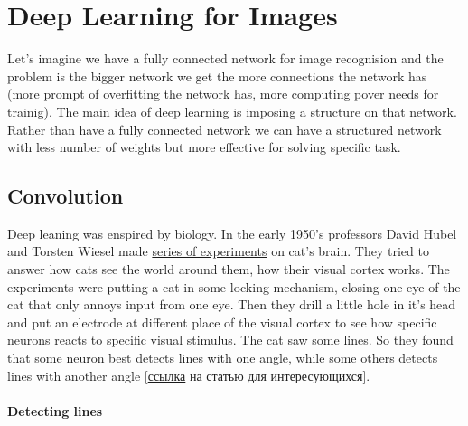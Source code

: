 \chapter{Deep Learning for Images}

{\sf Let's imagine we have a fully connected network for image recognision and the problem is the bigger network we get the more connections the network has (more prompt of overfitting the network has, more computing pover needs for trainig). The main idea of deep learning is imposing a structure on that network. Rather than have a fully connected network we can have a structured network with less number of weights but more effective for solving specific task.}

\section{Convolution}

Deep leaning was enspired by biology. In the early 1950's professors David Hubel and Torsten Wiesel made \href{https://youtu.be/IOHayh06LJ4}{series of experiments} on cat's brain. They tried to answer how cats see the world around them, how their visual cortex works. The experiments were putting a cat in some locking mechanism, closing one eye of the cat that only annoys input from one eye. Then they drill a little hole in it's head and put an electrode at different place of the visual cortex to see how specific neurons reacts to specific visual stimulus. The cat saw some lines. So they found that some neuron best detects lines with one angle, while some others detects lines with another angle [\href{https://www.ncbi.nlm.nih.gov/pmc/articles/PMC1363130/pdf/jphysiol01298-0128.pdf}{ссылка} на статью для интересующихся].

\subsubsection*{Detecting lines}

